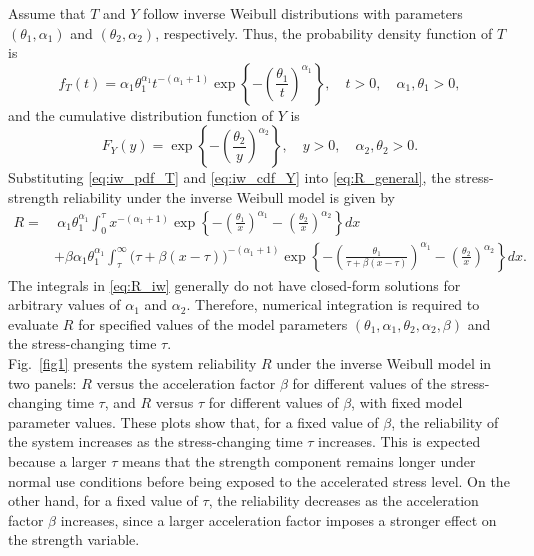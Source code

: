 \documentclass[twoside]{article}
\begin{document}
Assume that $T$ and $Y$ follow inverse Weibull distributions with parameters $(\theta_1,\alpha_1)$ and $(\theta_2,\alpha_2)$, respectively. Thus, the probability density function of $T$ is
\begin{equation}\label{eq:iw_pdf_T}
	f_T(t)=\alpha_1\theta_1^{\alpha_1}t^{-(\alpha_1+1)}
	\exp\left\{-\left(\frac{\theta_1}{t}\right)^{\alpha_1}\right\},
	\quad t>0,\quad \alpha_1,\theta_1>0,
\end{equation}
and the cumulative distribution function of $Y$ is
\begin{equation}\label{eq:iw_cdf_Y}
	F_Y(y)=
	\exp\left\{-\left(\frac{\theta_2}{y}\right)^{\alpha_2}\right\},
	\quad y>0,\quad \alpha_2,\theta_2>0.
\end{equation}
Substituting \eqref{eq:iw_pdf_T} and \eqref{eq:iw_cdf_Y} into \eqref{eq:R_general}, the stress-strength reliability under the inverse Weibull model is given by
\begin{align}\label{eq:R_iw}
	R
	=&\ \alpha_1\theta_1^{\alpha_1}
	\int_{0}^{\tau}
	x^{-(\alpha_1+1)}
	\exp\left\{
	-\left(\frac{\theta_1}{x}\right)^{\alpha_1}
	-\left(\frac{\theta_2}{x}\right)^{\alpha_2}
	\right\}dx \nonumber\\
	&+\beta\alpha_1\theta_1^{\alpha_1}
	\int_{\tau}^{\infty}
	\big(\tau+\beta(x-\tau)\big)^{-(\alpha_1+1)}
	\exp\left\{
	-\left(\frac{\theta_1}{\tau+\beta(x-\tau)}\right)^{\alpha_1}
	-\left(\frac{\theta_2}{x}\right)^{\alpha_2}
	\right\}dx .
\end{align}
The integrals in \eqref{eq:R_iw} generally do not have closed-form solutions for arbitrary values of $\alpha_1$ and $\alpha_2$. Therefore, numerical integration is required to evaluate $R$ for specified values of the model parameters $(\theta_1,\alpha_1,\theta_2,\alpha_2,\beta)$ and the stress-changing time $\tau$.\\
Fig.~\ref{fig1} presents the system reliability $R$ under the inverse Weibull model in two panels: $R$ versus the acceleration factor $\beta$ for different values of the stress-changing time $\tau$, and $R$ versus $\tau$ for different values of $\beta$, with fixed model parameter values. These plots show that, for a fixed value of $\beta$, the reliability of the system increases as the stress-changing time $\tau$ increases. This is expected because a larger $\tau$ means that the strength component remains longer under normal use conditions before being exposed to the accelerated stress level. On the other hand, for a fixed value of $\tau$, the reliability decreases as the acceleration factor $\beta$ increases, since a larger acceleration factor imposes a stronger effect on the strength variable.
\end{document}
